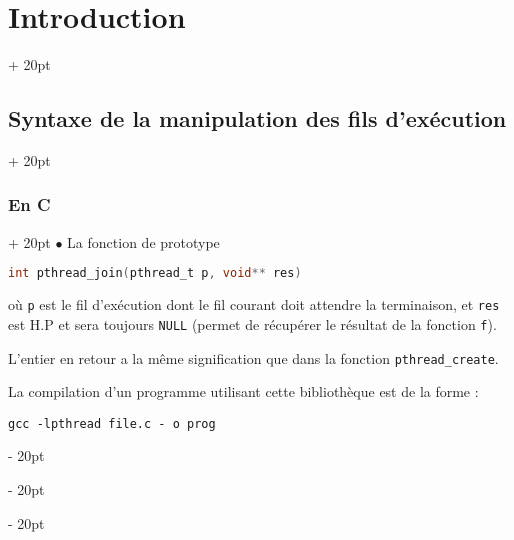 \documentclass[a4paper, 12pt, twoside]{article}
\newcommand{\ind}[1][20pt]{\advance\leftskip + #1}
\newcommand{\deind}[1][20pt]{\advance\leftskip - #1}
\newenvironment{indt}[2][20pt]{#2 \par \ind[#1]}{\par \deind} %
\begin{document}
\begin{indt}{\section{Introduction}}
\begin{indt}{\subsection{Syntaxe de la manipulation des fils d'exécution}}
\begin{indt}{\subsubsection{En C}}
                $\bullet$ La fonction de prototype

                \begin{lstlisting}[language=C, xleftmargin=80pt]
int pthread_join(pthread_t p, void** res)\end{lstlisting}

                où \texttt p est le fil d'exécution dont le fil courant doit attendre la terminaison, et \texttt{res} est H.P et sera toujours \texttt{NULL} (permet de récupérer le résultat de la fonction \texttt f).

                L'entier en retour a la même signification que dans la fonction \texttt{pthread\_create}.

                \vspace{12pt}
                
                La compilation d'un programme utilisant cette bibliothèque est de la forme :

                \begin{center}
                    \texttt{gcc -lpthread file.c - o prog}
                \end{center}
            \end{indt}
        \end{indt}
    \end{indt}

    \vspace{12pt}
    
\end{document}

